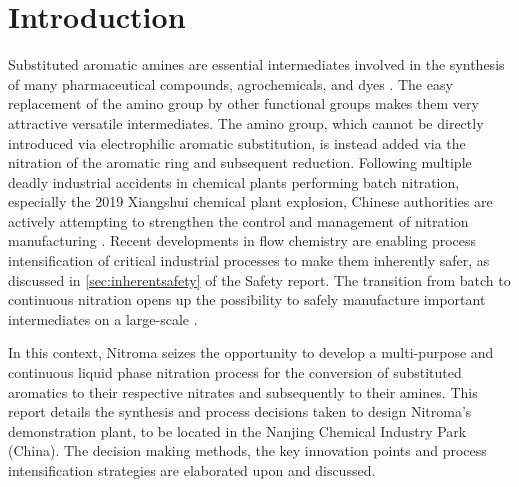 \section{Introduction} %

Substituted aromatic amines are essential intermediates involved in the synthesis of many pharmaceutical compounds, agrochemicals, and dyes \cite{vogt_amines_2000}. The easy replacement of the amino group by other functional groups makes them very attractive versatile intermediates. The amino group, which cannot be directly introduced via electrophilic aromatic substitution, is instead added via the nitration of the aromatic ring and subsequent reduction.
Following multiple deadly industrial accidents in chemical plants performing batch nitration, especially the 2019 Xiangshui chemical plant explosion, Chinese authorities are actively attempting to strengthen the control and management of nitration manufacturing \cite{el_diario_china_2019}.
Recent developments in flow chemistry are enabling process intensification of critical industrial processes to make them inherently safer, as discussed in \cref{sec:inherentsafety} of the Safety report. The transition from batch to continuous nitration opens up the possibility to safely manufacture important intermediates on a large-scale \cite{di_miceli_raimondi_safety_2015}.

In this context, Nitroma seizes the opportunity to develop a multi-purpose and continuous liquid phase nitration process for the conversion of substituted aromatics to their respective nitrates and subsequently to their amines. 
This report details the synthesis and process decisions taken to design Nitroma’s demonstration plant, to be located in the Nanjing Chemical Industry Park (China). The decision making methods, the key innovation points and process intensification strategies are elaborated upon and discussed.
